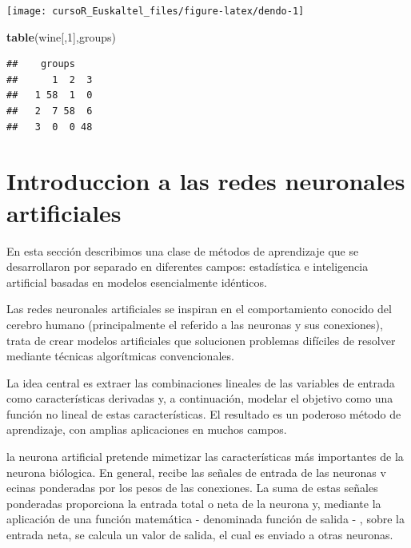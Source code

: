 \documentclass[]{book}
\newenvironment{Shaded}{\begin{snugshade}}{\end{snugshade}}
\newcommand{\KeywordTok}[1]{\textcolor[rgb]{0.13,0.29,0.53}{\textbf{#1}}}
\newcommand{\DecValTok}[1]{\textcolor[rgb]{0.00,0.00,0.81}{#1}}
\newcommand{\NormalTok}[1]{#1}
\begin{document}
\begin{center}\texttt{[image: cursoR\_Euskaltel\_files/figure-latex/dendo-1]} \end{center}

\begin{Shaded}
\begin{Highlighting}[]
\KeywordTok{table}\NormalTok{(wine[,}\DecValTok{1}\NormalTok{],groups)}
\end{Highlighting}
\end{Shaded}

\begin{verbatim}
##    groups
##      1  2  3
##   1 58  1  0
##   2  7 58  6
##   3  0  0 48
\end{verbatim}

\chapter{Introduccion a las redes neuronales
artificiales}\label{introduccion-a-las-redes-neuronales-artificiales}

En esta sección describimos una clase de métodos de aprendizaje que se
desarrollaron por separado en diferentes campos: estadística e
inteligencia artificial basadas en modelos esencialmente idénticos.

Las redes neuronales artificiales se inspiran en el comportamiento
conocido del cerebro humano (principalmente el referido a las neuronas y
sus conexiones), trata de crear modelos artificiales que solucionen
problemas difíciles de resolver mediante técnicas algorítmicas
convencionales.

La idea central es extraer las combinaciones lineales de las variables
de entrada como características derivadas y, a continuación, modelar el
objetivo como una función no lineal de estas características. El
resultado es un poderoso método de aprendizaje, con amplias aplicaciones
en muchos campos.

la neurona artificial pretende mimetizar las características más
importantes de la neurona biólogica. En general, recibe las señales de
entrada de las neuronas v ecinas ponderadas por los pesos de las
conexiones. La suma de estas señales ponderadas proporciona la entrada
total o neta de la neurona y, mediante la aplicación de una función
matemática - denominada función de salida - , sobre la entrada neta, se
calcula un valor de salida, el cual es enviado a otras neuronas.
\end{document}
